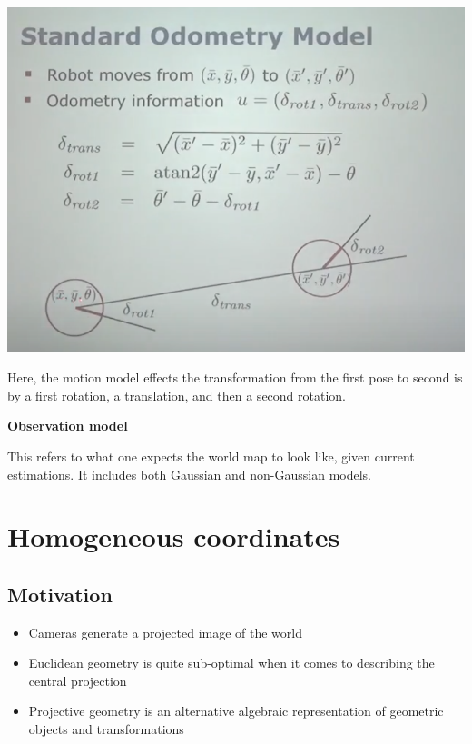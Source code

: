 \documentclass[a4paper]{article}
\begin{document}
\begin{center}
\includegraphics[scale=0.6]{stdod}
\end{center}

Here, the motion model effects the transformation from the first pose to second is by a first rotation, a translation, and then a second rotation.

\textbf{Observation model}

This refers to what one expects the world map to look like, given current estimations. It includes both Gaussian and non-Gaussian models.

\pagebreak


\section{Homogeneous coordinates}

\subsection{Motivation}

\begin{itemize}
    \item Cameras generate a projected image of the world
    \item Euclidean geometry is quite sub-optimal when it comes to describing the central projection
    \item Projective geometry is an alternative algebraic representation of geometric objects and transformations
\end{itemize}
\end{document}
